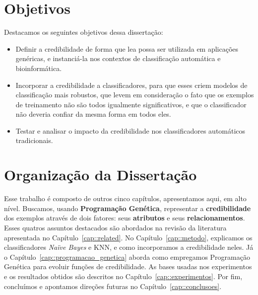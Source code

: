 \section{Objetivos}

Destacamos os seguintes objetivos dessa dissertação:

\begin{itemize}
 
\item Definir a credibilidade de forma que lea possa ser utilizada em aplicações genéricas, e instanciá-la nos contextos de classificação automática e bioinformática.
\item Incorporar a credibilidade a classificadores, para que esses criem modelos de classificação mais robustos, que levem em consideração o fato que os exemplos de treinamento não são todos igualmente significativos, e que o classificador não deveria confiar da mesma forma em todos eles. 
\item Testar e analisar o impacto da credibilidade nos classificadores automáticos tradicionais.

\end{itemize}

\section{Organização da Dissertação}

Esse trabalho é composto de outros cinco capítulos, apresentamos aqui, em alto nível.
Buscamos, usando \textbf{Programação Genética}, representar a \textbf{credibilidade} dos exemplos através de dois fatores: seus \textbf{atributos} e seus \textbf{relacionamentos}.
Esses quatros assuntos destacados são abordados na revisão da literatura apresentada no Capítulo~\ref{cap::related}.
No Capítulo~\ref{cap::metodo}, explicamos os classificadores \textit{Naïve Bayes} e \textsc{KNN}, e como incorporamos a credibilidade neles.
Já o Capítulo~\ref{cap::programacao_genetica} aborda como empregamos Programação Genética para evoluir funções de credibilidade.
As bases usadas nos experimentos e os resultados obtidos são descritos no Capítulo~\ref{cap::experimentos}. Por fim, concluímos e apontamos direções futuras no Capítulo~\ref{cap::conclusoes}.


